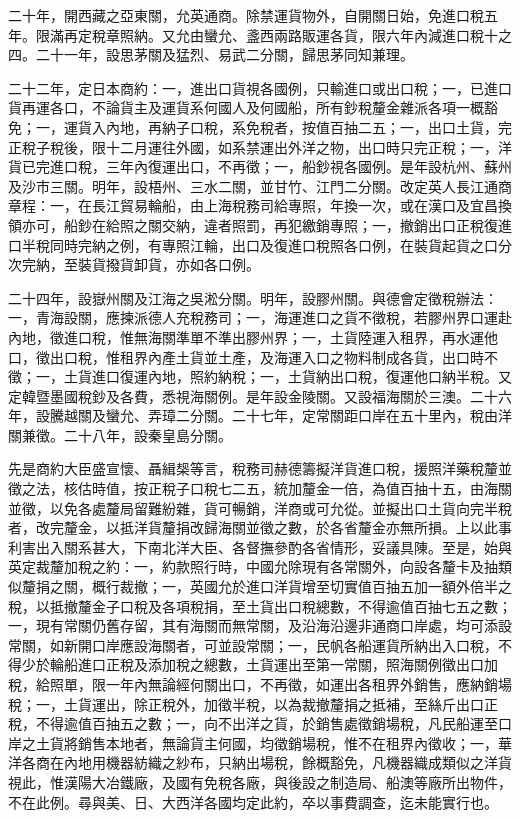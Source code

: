 \begin{pinyinscope}
二十年，開西藏之亞東關，允英通商。除禁運貨物外，自開關日始，免進口稅五年。限滿再定稅章照納。又允由蠻允、盞西兩路販運各貨，限六年內減進口稅十之四。二十一年，設思茅關及猛烈、易武二分關，歸思茅同知兼理。

二十二年，定日本商約：一，進出口貨視各國例，只輸進口或出口稅；一，已進口貨再運各口，不論貨主及運貨系何國人及何國船，所有鈔稅釐金雜派各項一概豁免；一，運貨入內地，再納子口稅，系免稅者，按值百抽二五；一，出口土貨，完正稅子稅後，限十二月運往外國，如系禁運出外洋之物，出口時只完正稅；一，洋貨已完進口稅，三年內復運出口，不再徵；一，船鈔視各國例。是年設杭州、蘇州及沙市三關。明年，設梧州、三水二關，並甘竹、江門二分關。改定英人長江通商章程：一，在長江貿易輪船，由上海稅務司給專照，年換一次，或在漢口及宜昌換領亦可，船鈔在給照之關交納，違者照罰，再犯繳銷專照；一，撤銷出口正稅復進口半稅同時完納之例，有專照江輪，出口及復進口稅照各口例，在裝貨起貨之口分次完納，至裝貨撥貨卸貨，亦如各口例。

二十四年，設嶽州關及江海之吳淞分關。明年，設膠州關。與德會定徵稅辦法：一，青海設關，應揀派德人充稅務司；一，海運進口之貨不徵稅，若膠州界口運赴內地，徵進口稅，惟無海關準單不準出膠州界；一，土貨陸運入租界，再水運他口，徵出口稅，惟租界內產土貨並土產，及海運入口之物料制成各貨，出口時不徵；一，土貨進口復運內地，照約納稅；一，土貨納出口稅，復運他口納半稅。又定韓暨墨國稅鈔及各費，悉視海關例。是年設金陵關。又設福海關於三澳。二十六年，設騰越關及蠻允、弄璋二分關。二十七年，定常關距口岸在五十里內，稅由洋關兼徵。二十八年，設秦皇島分關。

先是商約大臣盛宣懷、聶緝椝等言，稅務司赫德籌擬洋貨進口稅，援照洋藥稅釐並徵之法，核估時值，按正稅子口稅七二五，統加釐金一倍，為值百抽十五，由海關並徵，以免各處釐局留難紛雜，貨可暢銷，洋商或可允從。並擬出口土貨向完半稅者，改完釐金，以抵洋貨釐捐改歸海關並徵之數，於各省釐金亦無所損。上以此事利害出入關系甚大，下南北洋大臣、各督撫參酌各省情形，妥議具陳。至是，始與英定裁釐加稅之約：一，約款照行時，中國允除現有各常關外，向設各釐卡及抽類似釐捐之關，概行裁撤；一，英國允於進口洋貨增至切實值百抽五加一額外倍半之稅，以抵撤釐金子口稅及各項稅捐，至土貨出口稅總數，不得逾值百抽七五之數；一，現有常關仍舊存留，其有海關而無常關，及沿海沿邊非通商口岸處，均可添設常關，如新開口岸應設海關者，可並設常關；一，民帆各船運貨所納出入口稅，不得少於輪船進口正稅及添加稅之總數，土貨運出至第一常關，照海關例徵出口加稅，給照單，限一年內無論經何關出口，不再徵，如運出各租界外銷售，應納銷場稅；一，土貨運出，除正稅外，加徵半稅，以為裁撤釐捐之抵補，至絲斤出口正稅，不得逾值百抽五之數；一，向不出洋之貨，於銷售處徵銷場稅，凡民船運至口岸之土貨將銷售本地者，無論貨主何國，均徵銷場稅，惟不在租界內徵收；一，華洋各商在內地用機器紡織之紗布，只納出場稅，餘概豁免，凡機器織成類似之洋貨視此，惟漢陽大冶鐵廠，及國有免稅各廠，與後設之制造局、船澳等廠所出物件，不在此例。尋與美、日、大西洋各國均定此約，卒以事費調查，迄未能實行也。


\end{pinyinscope}
